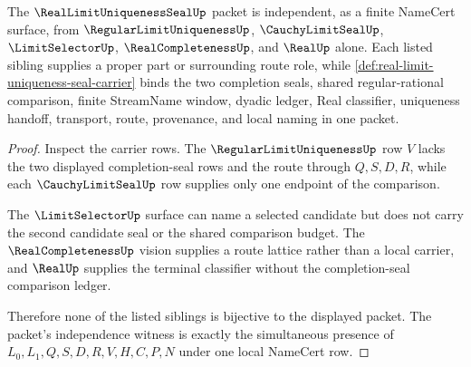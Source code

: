 \begin{theorem}
\label{thm:real-limit-uniqueness-seal-independent-witness}
The $\RealLimitUniquenessSealUp$ packet is independent, as a finite NameCert surface, from $\RegularLimitUniquenessUp$, $\CauchyLimitSealUp$, $\LimitSelectorUp$, $\RealCompletenessUp$, and $\RealUp$ alone. Each listed sibling supplies a proper part or surrounding route role, while \autoref{def:real-limit-uniqueness-seal-carrier} binds the two completion seals, shared regular-rational comparison, finite StreamName window, dyadic ledger, Real classifier, uniqueness handoff, transport, route, provenance, and local naming in one packet.
\end{theorem}
\begin{proof}
Inspect the carrier rows. The $\RegularLimitUniquenessUp$ row $V$ lacks the two displayed completion-seal rows and the route through $Q,S,D,R$, while each $\CauchyLimitSealUp$ row supplies only one endpoint of the comparison.

The $\LimitSelectorUp$ surface can name a selected candidate but does not carry the second candidate seal or the shared comparison budget. The $\RealCompletenessUp$ vision supplies a route lattice rather than a local carrier, and $\RealUp$ supplies the terminal classifier without the completion-seal comparison ledger.

Therefore none of the listed siblings is bijective to the displayed packet. The packet's independence witness is exactly the simultaneous presence of $L_0,L_1,Q,S,D,R,V,H,C,P,N$ under one local NameCert row.
\end{proof}

